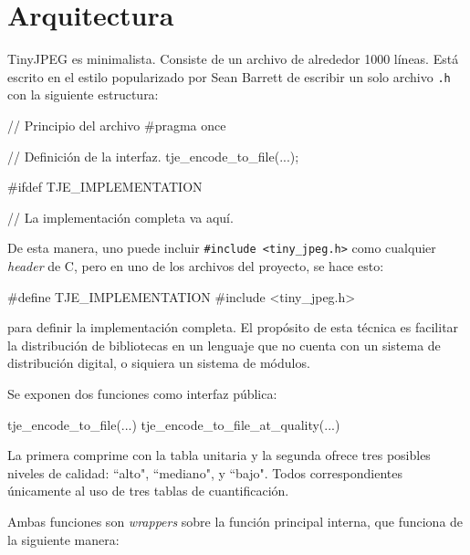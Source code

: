 \section{Arquitectura}

TinyJPEG es minimalista. Consiste de un archivo de alrededor 1000 líneas. Está
escrito en el estilo popularizado por Sean Barrett de escribir un solo archivo
\verb+.h+ con la siguiente estructura:

\label{alg:stb}
\begin{code}[language=C][h]
    // Principio del archivo
    #pragma once

    // Definición de la interfaz.
    tje_encode_to_file(...);

    #ifdef TJE_IMPLEMENTATION

    // La implementación completa va aquí.
\end{code}

De esta manera, uno puede incluir \verb+#include <tiny_jpeg.h>+ como cualquier
\emph{header} de C, pero en uno de los archivos del proyecto, se hace esto:

\label{alg:stb_impl}
\begin{code}[language=C][h]
    #define TJE_IMPLEMENTATION
    #include <tiny_jpeg.h>
\end{code}

para definir la implementación completa. El propósito de esta técnica es
facilitar la distribución de bibliotecas en un lenguaje que no cuenta con un
sistema de distribución digital, o siquiera un sistema de módulos.

Se exponen dos funciones como interfaz pública:

\begin{code}[language=C][h]
tje_encode_to_file(...)
tje_encode_to_file_at_quality(...)
\end{code}

La primera comprime con la tabla unitaria y la segunda ofrece tres posibles
niveles de calidad: ``alto", ``mediano", y ``bajo". Todos correspondientes
únicamente al uso de tres tablas de cuantificación.

Ambas funciones son \emph{wrappers} sobre la función principal
interna, que funciona de la siguiente manera:

